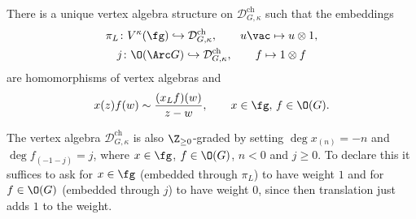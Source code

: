 \documentclass[a4paper, 10pt]{article}
\newcommand{\Dc}{ \mathcal{D}^{\mathrm{ch}}_{G, \kappa} }         %
\begin{document}
            \begin{thm}
                There is a unique vertex algebra structure on $\Dc$ such that the embeddings 
                \begin{gather*}
                    \pi_L\colon V^{\kappa}(\fg) \hookrightarrow \Dc, \qquad u\vac \mapsto u \otimes 1, \\
                    j\colon \O(\Arc G) \hookrightarrow \Dc, \qquad f \mapsto 1 \otimes f
                \end{gather*} are homomorphisms of vertex algebras and \[x(z)f(w) \sim \frac{(x_Lf)(w)}{z - w}, \qquad x \in \fg,\, f \in \O(G). \]
            \end{thm}
            The vertex algebra $\Dc$ is also $\Z_{\geq 0}$-graded by setting $\deg x_{(n)} = -n$ and $\deg f_{(-1-j)} = j$, where $x \in \fg$, $f \in \O(G)$, $n < 0$ and $j \geq 0$. To declare this it suffices to ask for $x \in \fg$ (embedded through $\pi_L$) to have weight $1$ and for $f \in \O(G)$ (embedded through $j$) to have weight $0$, since then translation just adds $1$ to the weight.
\end{document}
